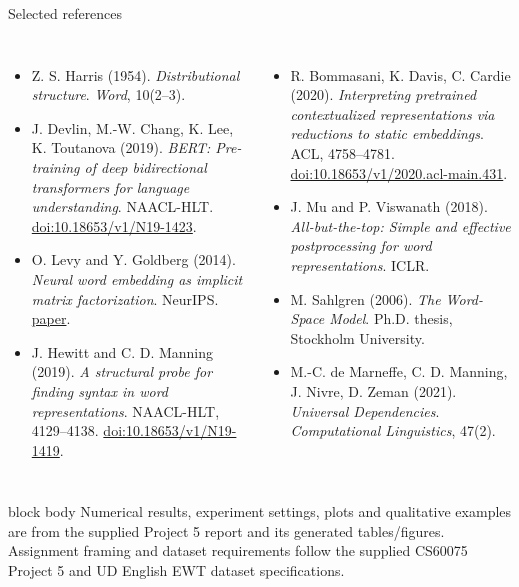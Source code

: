 \documentclass[aspectratio=169,9pt]{beamer}
\begin{document}
\begin{frame}{Selected references}
\footnotesize
\begin{columns}[T,onlytextwidth]
  \begin{itemize}\setlength{\itemsep}{0.55em}
    \item Z. S. Harris (1954). \textit{Distributional structure}. \textit{Word}, 10(2--3).
    \item J. Devlin, M.-W. Chang, K. Lee, K. Toutanova (2019). \textit{BERT: Pre-training of deep bidirectional transformers for language understanding}. NAACL-HLT. \href{https://doi.org/10.18653/v1/N19-1423}{doi:10.18653/v1/N19-1423}.
    \item O. Levy and Y. Goldberg (2014). \textit{Neural word embedding as implicit matrix factorization}. NeurIPS. \href{https://papers.neurips.cc/paper/5477-neural-word-embedding-as-implicit-matrix-factorization}{paper}.
    \item J. Hewitt and C. D. Manning (2019). \textit{A structural probe for finding syntax in word representations}. NAACL-HLT, 4129--4138. \href{https://doi.org/10.18653/v1/N19-1419}{doi:10.18653/v1/N19-1419}.
  \end{itemize}
  \begin{itemize}\setlength{\itemsep}{0.55em}
    \item R. Bommasani, K. Davis, C. Cardie (2020). \textit{Interpreting pretrained contextualized representations via reductions to static embeddings}. ACL, 4758--4781. \href{https://doi.org/10.18653/v1/2020.acl-main.431}{doi:10.18653/v1/2020.acl-main.431}.
    \item J. Mu and P. Viswanath (2018). \textit{All-but-the-top: Simple and effective postprocessing for word representations}. ICLR.
    \item M. Sahlgren (2006). \textit{The Word-Space Model}. Ph.D. thesis, Stockholm University.
    \item M.-C. de Marneffe, C. D. Manning, J. Nivre, D. Zeman (2021). \textit{Universal Dependencies}. \textit{Computational Linguistics}, 47(2).
  \end{itemize}
\end{columns}
\vspace{0.5em}
\begin{beamercolorbox}[rounded=true,sep=0.8ex,wd=\linewidth]{block body}
  \scriptsize Numerical results, experiment settings, plots and qualitative examples are from the supplied Project 5 report and its generated tables/figures. Assignment framing and dataset requirements follow the supplied CS60075 Project 5 and UD English EWT dataset specifications.
\end{beamercolorbox}
\end{frame}
\end{document}
